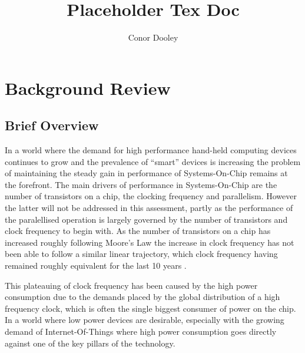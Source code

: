 \documentclass[11pt,english,british]{report}
\begin{document}
\title{Placeholder Tex Doc}
\author{Conor Dooley}
\maketitle
\chapter{Background Review}
\section{Brief Overview}
\doublespacing
In a world where the demand for high performance hand-held computing devices continues to grow and the prevalence of ``smart'' devices is increasing the problem of maintaining the steady gain in performance of Systems-On-Chip remains at the forefront. %
The main drivers of performance in Systems-On-Chip are the number of transistors on a chip, the clocking frequency and parallelism. However the latter will not be addressed in this assessment, partly as the performance of the paralellised operation is largely governed by the number of transistors and clock frequency to begin with. %
As the number of transistors on a chip has increased roughly following Moore's Law the increase in clock frequency has not been able to follow a similar linear trajectory, which clock frequency having remained roughly equivalent for the last 10 years \cite{ross2008cpu}.

This plateauing of clock frequency has been caused by the high power consumption due to the demands placed by the global distribution of a high frequency clock, which is often the single biggest consumer of power on the chip. %
In a world where low power devices are desirable, especially with the growing demand of Internet-Of-Things where high power consumption goes directly against one of the key pillars of the technology. %
\end{document}
